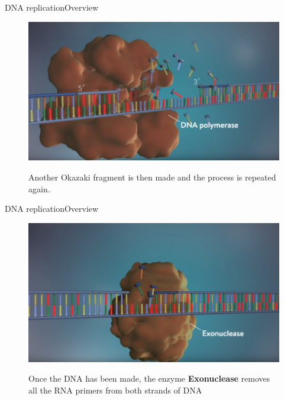 \documentclass[10pt]{beamer}
\begin{document}
{%
\begin{frame}{DNA replication}{Overview}
	\begin{figure}[]
		\centering
		\includegraphics[width=\textwidth,height=0.6\textheight,keepaspectratio]{img/introduction/dna45.jpg}
		\label{img:mot2}
		\caption{Another Okazaki fragment is then made and the process is repeated again. }
	\end{figure}
\end{frame}


\begin{frame}{DNA replication}{Overview}
	\begin{figure}[]
		\centering
		\includegraphics[width=\textwidth,height=0.6\textheight,keepaspectratio]{img/introduction/dna46.jpg}
		\label{img:mot2}
		\caption{Once the DNA has been made, the enzyme \textbf{Exonuclease} removes all the RNA primers from both strands of DNA }
	\end{figure}
\end{frame}

}
\end{document}
